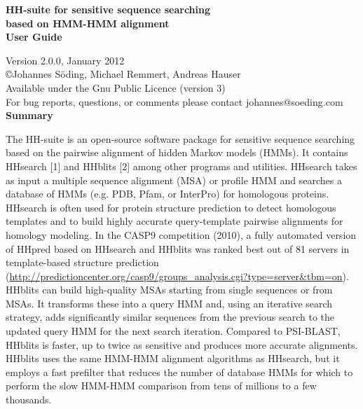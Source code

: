 \documentclass[11pt,a4paper]{article}
\begin{document}


\begin{center}

\vspace{20mm}
 
{\huge \bf HH-suite for sensitive sequence searching\\[2mm] based on HMM-HMM alignment}\\[4mm] 

{\Large \bf User Guide}

  Version 2.0.0, January 2012\\[2mm]
{\copyright  Johannes S\"oding, Michael Remmert, Andreas Hauser}\\[2mm]
Available under the Gnu Public Licence (version 3)\\[2mm]
For bug reports, questions, or comments please contact johannes@soeding.com\\[10mm]

{\bf \Large Summary}

\end{center}

\noindent The HH-suite is an open-source software package for sensitive sequence searching based on the pairwise alignment of hidden Markov models (HMMs). It contains HHsearch [1] and HHblits [2] among other programs and utilities. HHsearch takes as input a multiple sequence alignment (MSA) or profile HMM and searches a database of HMMs (e.g. PDB, Pfam, or InterPro) for homologous proteins. HHsearch is often used for protein structure prediction to detect homologous templates and to build highly accurate query-template pairwise alignments for homology modeling. In the CASP9 competition (2010), a fully automated version of HHpred based on HHsearch and HHblits was ranked best out of 81 servers in template-based structure prediction (\url{http://predictioncenter.org/casp9/groups_analysis.cgi?type=server&tbm=on}). HHblits can build high-quality MSAs starting from single sequences or from MSAs. It transforms these into a query HMM and, using an iterative search strategy, adds significantly similar sequences from the previous search to the updated query HMM for the next search iteration. Compared to PSI-BLAST, HHblits is faster, up to twice as sensitive and produces more accurate alignments. HHblits uses the same HMM-HMM alignment algorithms as HHsearch, but it employs a fast prefilter that reduces the number of database HMMs for which to perform the slow HMM-HMM comparison from tens of millions to a few thousands. \\[2mm]
\end{document}
